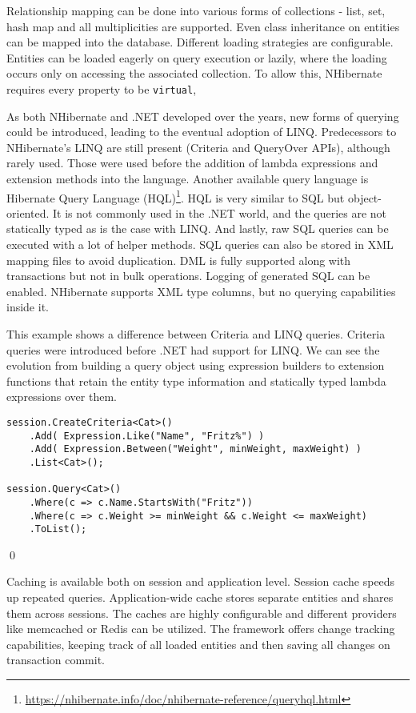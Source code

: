Relationship mapping can be done into various forms of collections - list, set, hash map and all multiplicities are supported. Even class inheritance on entities can be mapped into the database. Different loading strategies are configurable. Entities can be loaded eagerly on query execution or lazily, where the loading occurs only on accessing the associated collection. To allow this, NHibernate requires every property to be \texttt{virtual},

As both NHibernate and .NET developed over the years, new forms of querying could be introduced, leading to the eventual adoption of LINQ. Predecessors to NHibernate's LINQ are still present (Criteria and QueryOver APIs), although rarely used. Those were used before the addition of lambda expressions and extension methods into the language. Another available query language is Hibernate Query Language (HQL)\footnote{\url{https://nhibernate.info/doc/nhibernate-reference/queryhql.html}}. HQL is very similar to SQL but object-oriented. It is not commonly used in the .NET world, and the queries are not statically typed as is the case with LINQ. And lastly, raw SQL queries can be executed with a lot of helper methods. SQL queries can also be stored in XML mapping files to avoid duplication. DML is fully supported along with transactions but not in bulk operations. Logging of generated SQL can be enabled. NHibernate supports XML type columns, but no querying capabilities inside it.

\begin{example}
\small
This example\cite{nhibernate} shows a difference between Criteria and LINQ queries. Criteria queries were introduced before .NET had support for LINQ. We can see the evolution from building a query object using expression builders to extension functions that retain the entity type information and statically typed lambda expressions over them. 

\begin{lstlisting}[language=CSharp]
session.CreateCriteria<Cat>()
    .Add( Expression.Like("Name", "Fritz%") )
    .Add( Expression.Between("Weight", minWeight, maxWeight) )
    .List<Cat>();

session.Query<Cat>()
    .Where(c => c.Name.StartsWith("Fritz"))
    .Where(c => c.Weight >= minWeight && c.Weight <= maxWeight)
    .ToList();
\end{lstlisting}
\qed
\end{example}

Caching is available both on session and application level. Session cache speeds up repeated queries. Application-wide cache stores separate entities and shares them across sessions. The caches are highly configurable and different providers like memcached or Redis can be utilized.
The framework offers change tracking capabilities, keeping track of all loaded entities and then saving all changes on transaction commit.


